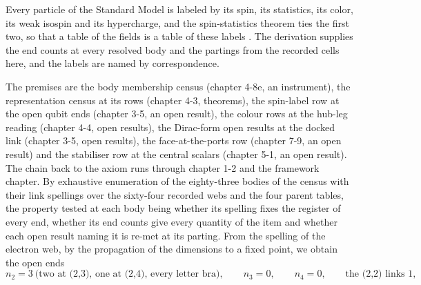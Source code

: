 \begin{chbridge}
Every particle of the Standard Model is labeled by its spin, its statistics, its color, its weak isospin and its hypercharge, and the spin-statistics theorem ties the first two, so that a table of the fields is a table of these labels \cite{Pauli1940,Weinberg1995}. The derivation supplies the end counts at every resolved body and the partings from the recorded cells here, and the labels are named by correspondence.
\end{chbridge}
\begin{chproof}
The premises are the body membership census (chapter 4-8e, an instrument), the representation census at its rows (chapter 4-3, theorems), the spin-label row at the open qubit ends (chapter 3-5, an open result), the colour rows at the hub-leg reading (chapter 4-4, open results), the Dirac-form open results at the docked link (chapter 3-5, open results), the face-at-the-ports row (chapter 7-9, an open result) and the stabiliser row at the central scalars (chapter 5-1, an open result). The chain back to the axiom runs through chapter 1-2 and the framework chapter. By exhaustive enumeration of the eighty-three bodies of the census with their link spellings over the sixty-four recorded webs and the four parent tables, the property tested at each body being whether its spelling fixes the register of every end, whether its end counts give every quantity of the item and whether each open result naming it is re-met at its parting. From the spelling of the electron web, by the propagation of the dimensions to a fixed point, we obtain the open ends
\begin{equation}
n_{2} = 3 \ \text{(two at (2,3), one at (2,4), every letter bra)} , \qquad n_{3} = 0 , \qquad n_{4} = 0 , \qquad \text{the (2,2) links } 1 ,
\end{equation}

\end{chproof}
